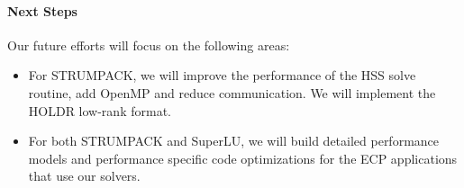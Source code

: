 \paragraph{Next Steps} Our future efforts will focus on the following areas:
\begin{itemize}
\item For STRUMPACK, we will improve the performance of the HSS solve
      routine, add OpenMP and reduce communication. We will implement
      the HOLDR low-rank format.
\item For both STRUMPACK and SuperLU, we will build detailed performance
      models and performance specific code optimizations for the ECP
      applications that use our solvers.
\end{itemize}
